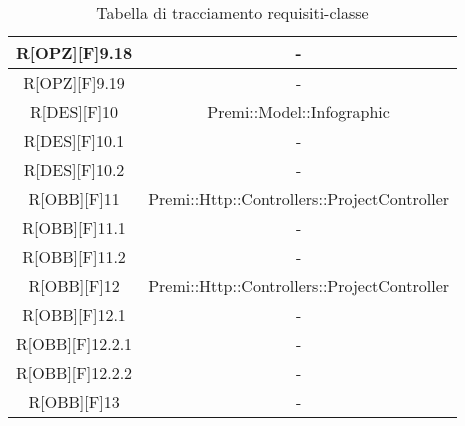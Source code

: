 \begin{table}[h]
	\begin{center}
		\begin{tabular}{|c|c|}
			\toprule
			R[OPZ][F]9.18 & -\\
		\midrule
			R[OPZ][F]9.19 & -\\
		\midrule
			R[DES][F]10 & Premi::Model::Infographic\\
		\midrule
			R[DES][F]10.1 & -\\
		\midrule
			R[DES][F]10.2 & -\\
		\midrule
			R[OBB][F]11 & Premi::Http::Controllers::ProjectController\\
		\midrule
			R[OBB][F]11.1 & -\\
		\midrule
			R[OBB][F]11.2 & -\\
		\midrule
			R[OBB][F]12 & Premi::Http::Controllers::ProjectController\\
		\midrule
			R[OBB][F]12.1 & -\\
		\midrule
			R[OBB][F]12.2.1 & -\\
		\midrule
			R[OBB][F]12.2.2 & -\\
		\midrule
			R[OBB][F]13 & -\\
			\bottomrule
		\end{tabular}
	\end{center}
	\caption{Tabella di tracciamento requisiti-classe}
\end{table}
